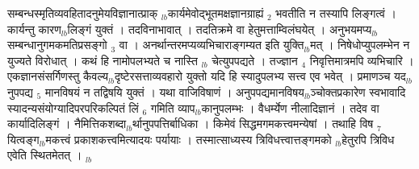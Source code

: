 \documentclass[article,12pt,a4paper]{memoir}%
\newcounter{parCount}
\begin{document}
सम्बन्धस्मृतिव्यवहितादनुमेयविज्ञानात्प्राक् {\tiny $_{lb}$}कार्यमेवोद्भूतमक्षज्ञानग्राह्यं {\tiny $_{2}$} भवतीति न तस्यापि लिङ्गत्वं । कार्यन्तु कारण{\tiny $_{lb}$}लिङ्गं युक्तं । तदविनाभावात् । तदतिक्रमे वा हेतुमत्ताम्विलंघयेत् । अनुभयमप्य{\tiny $_{lb}$}सम्बन्धानुगमकमतिप्रसङ्गो {\tiny $_{3}$} वा । अनर्थान्तरमप्यव्यभिचाराङ्गम्यत इति युक्ति{\tiny $_{lb}$}मत् । निषेधोप्युपलम्भेन न युज्यते विरोधात् । कथं हि नामोपलभ्यते च नास्ति {\tiny $_{lb}$} \leavevmode{} चेत्युपपद्यते । तज्ज्ञान {\tiny $_{4}$} निवृत्तिमात्रमपि व्यभिचारि । एकज्ञानसंसर्गिणस्तु कैवल्य{\tiny $_{lb}$}दृष्टेरसत्ताव्यवहारो युक्तो यदि हि स्यादुपलभ्य सत्त्व एव भवेत् । प्रमाणञ्च यद{\tiny $_{lb}$}नुपपद्य {\tiny $_{5}$} मानविषयं न तद्विषयि युक्तं । यथा वाजिविषाणं । अनुपपद्यमानविषय{\tiny $_{lb}$}ञ्चोक्तप्रकारेण स्वभावादि स्यादन्यसंयोग्यादिपरपरिकल्पितं लिं {\tiny $_{6}$} गमिति व्याप{\tiny $_{lb}$}कानुपलम्भः । वैधर्म्येण नीलादिज्ञानं । तदेव वा कार्यादिलिङ्गं । नैमित्तिकशब्दा{\tiny $_{lb}$}र्थानुपपत्तिर्बाधिका । किमेवं सिद्धमगमकत्त्वमन्येषां । तथाहि विष {\tiny $_{7}$} यित्वङ्ग{\tiny $_{lb}$}मकत्त्वं प्रकाशकत्त्वमित्यादयः पर्यायाः । तस्मात्साध्यस्य त्रिविधत्त्वात्तङ्गमको {\tiny $_{lb}$}हेतुरपि त्रिविध एवेति स्थितमेतत् ।
	{}
	\pend%
      {\tiny $_{lb}$}
\end{document}
